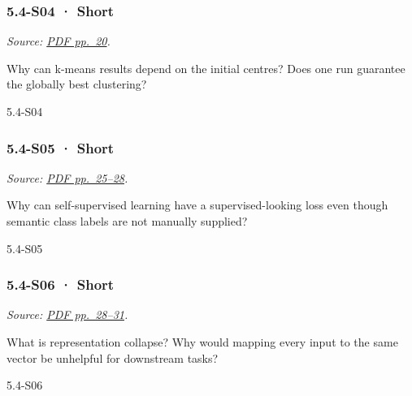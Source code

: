 \noindent\begin{minipage}{\linewidth}

\subsubsection{5.4-S04 · Short}\label{s04-short-15}

\emph{Source:
\href{../Lecture\%20Slides/5.4.\%20Unsupervised\%20learning.pdf\#page=20}{PDF
pp.~20}.}

Why can k-means results depend on the initial centres? Does one run
guarantee the globally best clustering?

\begin{solution}[20mm]{5.4-S04}

\end{solution}
\end{minipage}\par\medskip

\noindent\begin{minipage}{\linewidth}

\subsubsection{5.4-S05 · Short}\label{s05-short-15}

\emph{Source:
\href{../Lecture\%20Slides/5.4.\%20Unsupervised\%20learning.pdf\#page=25}{PDF
pp.~25--28}.}

Why can self-supervised learning have a supervised-looking loss even
though semantic class labels are not manually supplied?

\begin{solution}[20mm]{5.4-S05}

\end{solution}
\end{minipage}\par\medskip

\noindent\begin{minipage}{\linewidth}

\subsubsection{5.4-S06 · Short}\label{s06-short-15}

\emph{Source:
\href{../Lecture\%20Slides/5.4.\%20Unsupervised\%20learning.pdf\#page=28}{PDF
pp.~28--31}.}

What is representation collapse? Why would mapping every input to the
same vector be unhelpful for downstream tasks?

\begin{solution}[20mm]{5.4-S06}

\end{solution}
\end{minipage}\par\medskip

